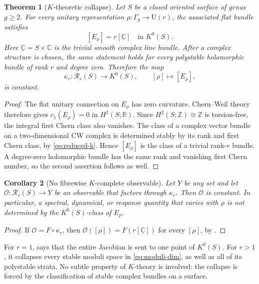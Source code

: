 \documentclass[11pt]{article}
\newtheorem{theorem}{Theorem}[section]
\newtheorem{corollary}[theorem]{Corollary}
\theoremstyle{definition}
\theoremstyle{remark}
\newcommand{\CC}{\mathbb C}
\newcommand{\RR}{\mathbb R}
\newcommand{\ZZ}{\mathbb Z}
\newcommand{\UU}{\mathrm U}
\newcommand{\cR}{\mathcal R}
\begin{document}
\begin{theorem}[\(K\)-theoretic collapse]
\label{thm:k-collapse}
Let \(S\) be a closed oriented surface of genus \(g\geq2\).
For every unitary representation \(\rho:\Gamma_g\to\UU(r)\), the associated
flat bundle satisfies
\[
                    [E_\rho]=r[\underline{\CC}]
                    \quad\text{in }K^0(S).
                    \tag{3.3}\label{eq:k-collapse}
\]
Here \(\underline{\CC}=S\times\CC\) is the trivial smooth complex line
bundle.
After a complex structure is chosen, the same statement holds for every
polystable holomorphic bundle of rank \(r\) and degree zero.  Therefore the
map
\[
  \kappa_r:\cR_r(S)\longrightarrow K^0(S),
  \qquad [\rho]\longmapsto[E_\rho],
  \tag{3.4}\label{eq:kappa-map}
\]
is constant.
\end{theorem}

\begin{proof}
The flat unitary connection on \(E_\rho\) has zero curvature.  Chern--Weil
theory therefore gives \(c_1(E_\rho)=0\) in \(H^2(S;\RR)\).  Since
\(H^2(S;\ZZ)\cong\ZZ\) is torsion-free, the integral first Chern class also
vanishes.  The class of a complex vector bundle on a two-dimensional CW
complex is determined stably by its rank and first Chern class, by
\eqref{eq:reduced-k}.  Hence \([E_\rho]\) is the class of a trivial rank-\(r\)
bundle.  A degree-zero holomorphic bundle has the same rank and vanishing
first Chern number, so the second assertion follows as well.
\end{proof}

\begin{corollary}[No fibrewise \(K\)-complete observable]
\label{cor:k-observable-constant}
Let \(Y\) be any set and let
\(\mathcal O:\cR_r(S)\to Y\) be an observable that factors through
\(\kappa_r\).  Then \(\mathcal O\) is constant.  In particular, a spectral,
dynamical, or response quantity that varies with \(\rho\) is not determined
by the \(K^0(S)\)-class of \(E_\rho\).
\end{corollary}

\begin{proof}
If \(\mathcal O=F\circ\kappa_r\), then
\(\mathcal O([\rho])=F(r[\underline{\CC}])\) for every \([\rho]\), by
.
\end{proof}

For \(r=1\),  says that the entire Jacobian is sent to
one point of \(K^0(S)\).  For \(r>1\), it collapses every stable moduli space
in \eqref{eq:moduli-dim}, as well as all of its polystable strata.  No
subtle property of \(K\)-theory is involved: the collapse is forced by the
classification of stable complex bundles on a surface.
\end{document}
